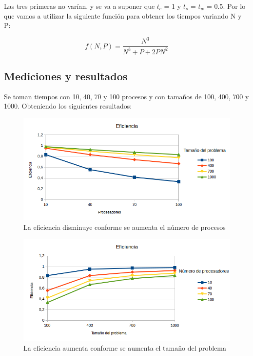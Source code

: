 Las tres primeras no varían, y se va a suponer que $t_{c}$ = 1 y $t_{s}$ = $t_{w}$ = 0.5. Por lo que vamos a utilizar la siguiente función para obtener los tiempos variando N y P:

\begin{equation}
	f(N,P) = \dfrac{N^{3}}{N^{3} + P + 2PN^{2}}
\end{equation}

\subsection{Mediciones y resultados}

Se toman tiempos con 10, 40, 70 y 100 procesos y con tamaños de 100, 400, 700 y 1000. Obteniendo los siguientes resultados:

\begin{figure}[H]
	\centering
	\includegraphics[width=15cm]{imagenes/grafico1}
	\caption{La eficiencia disminuye conforme se aumenta el número de procesos}
	\label{fig:grafico1}
\end{figure}


\begin{figure}[H]
	\centering
	\includegraphics[width=15cm]{imagenes/grafico2}
	\caption{La eficiencia aumenta conforme se aumenta el tamaño del problema}
	\label{fig:grafico2}
\end{figure}


